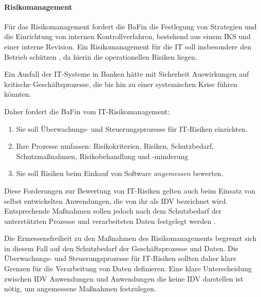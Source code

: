 \paragraph{Risikomanagement}
Für das Risikomanagement fordert die \ac{BaFin} die Festlegung von Strategien und die Einrichtung von internen Kontrollverfahren, bestehend aus einem \ac{IKS} und einer interne Revision. Ein Risikomanagement für die IT soll insbesondere den Betrieb schützen \cite{MaRisk:2017}, da hierin die operationellen Risiken liegen. 

Ein Ausfall der IT-Systeme in Banken hätte mit Sicherheit Auswirkungen auf kritische Geschäftsprozesse, die bis hin zu einer systemischen Krise führen könnten.

Daher fordert die \ac{BaFin} \cite{MaRisk:2017} vom IT-Risikomanagement:
\begin{enumerate}
    \item Sie soll Überwachungs- und Steuerungsprozesse für IT-Risiken einrichten.
    \item Ihre Prozesse umfassen: Risikokriterien, Risiken, Schutzbedarf, Schutzmaßnahmen, Risikobehandlung und -minderung
    \item Sie soll Risiken beim Einkauf von Software \emph{angemessen} bewerten.
\end{enumerate}
Diese Forderungen \cite{MaRisk:2017} zur Bewertung von IT-Risiken gelten auch beim Einsatz von selbst entwickelten Anwendungen, die von ihr als \ac{IDV} bezeichnet wird. Entsprechende Maßnahmen sollen jedoch nach dem Schutzbedarf der unterstützten Prozesse und verarbeiteten Daten festgelegt werden \cite{MaRisk:2017}.

Die Ermessensfreiheit zu den Maßnahmen des Risikomanagements begrenzt sich in diesem Fall auf den Schutzbedarf der Geschäftsprozesse und Daten. Die Überwachungs- und Steuerungsprozesse für IT-Risiken sollten daher klare Grenzen für die Verarbeitung von Daten definieren. Eine klare Unterscheidung zwischen \ac{IDV} Anwendungen und Anwendungen die keine \ac{IDV} darstellen ist nötig, um angemessene Maßnahmen festzulegen.

